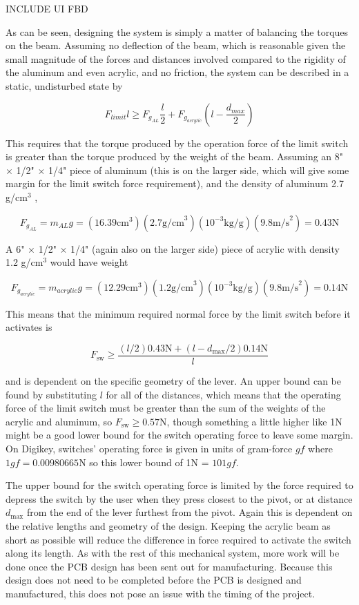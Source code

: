 \documentclass{article}
\begin{document}
	INCLUDE UI FBD

	As can be seen, designing the system is simply a matter of balancing the torques on the beam.  Assuming no deflection of the beam, which is reasonable given the small magnitude of the forces and distances involved compared to the rigidity of the aluminum and even acrylic, and no friction, the system can be described in a static, undisturbed state by

	$$ F_{limit} l \ge F_{g_{AL}} \frac{l}{2} + F_{g_{acrylic}} \left( l - \frac{d_{max}}{2} \right) $$

	This requires that the torque produced by the operation force of the limit switch is greater than the torque produced by the weight of the beam.  Assuming an 8" $\times$ 1/2" $\times$ 1/4" piece of aluminum (this is on the larger side, which will give some margin for the limit switch force requirement), and the density of aluminum 2.7 g/cm$^3$ \cite{SolidsDensities}, 

	$$ F_{g_{AL}} = m_{AL}g = \left(16.39\text{cm}^3\right) \left(2.7 \text{g/cm}^3 \right) \left( 10^{-3}\text{kg}/\text{g} \right) \left( 9.8 \text{m/s}^2 \right) = 0.43 \text{N} $$

	A 6" $\times$ 1/2" $\times$ 1/4" (again also on the larger side) piece of acrylic with density 1.2 g/cm$^3$ \cite{SolidsDensities} would have weight

	$$ F_{g_{acrylic}} = m_{acrylic}g = \left( 12.29\text{cm}^3 \right) \left( 1.2 \text{g/cm}^3 \right) \left( 10^{-3}\text{kg}/\text{g} \right) \left( 9.8 \text{m/s}^2 \right) = 0.14\text{N}$$

	This means that the minimum required normal force by the limit switch before it activates is

	$$ F_\text{sw} \ge \frac{(l/2)0.43\text{N} + (l-d_\text{max}/2) 0.14\text{N}}{l} $$

	and is dependent on the specific geometry of the lever.  An upper bound can be found by substituting $l$ for all of the distances, which means that the operating force of the limit switch must be greater than the sum of the weights of the acrylic and aluminum, so $F_\text{sw} \ge 0.57\text{N}$, though something a little higher like 1N might be a good lower bound for the switch operating force to leave some margin.  On Digikey, switches' operating force is given in units of gram-force $gf$ where $1gf = 0.00980665\text{N}$ so this lower bound of 1N = $101gf$.

	The upper bound for the switch operating force is limited by the force required to depress the switch by the user when they press closest to the pivot, or at distance $d_\text{max}$ from the end of the lever furthest from the pivot.  Again this is dependent on the relative lengths and geometry of the design.  Keeping the acrylic beam as short as possible will reduce the difference in force required to activate the switch along its length.  As with the rest of this mechanical system, more work will be done once the PCB design has been sent out for manufacturing.  Because this design does not need to be completed before the PCB is designed and manufactured, this does not pose an issue with the timing of the project.
\end{document}
